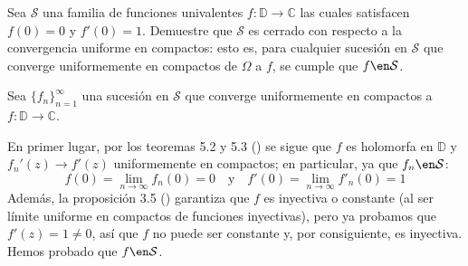 \setcounter{neje}{3}
\begin{nejer}
Sea $\mathcal{S}$ una familia de funciones univalentes $f\colon \mathbb{D} \to \mathbb{C}$ las cuales satisfacen $f(0) = 0$ y $f'(0) = 1$. Demuestre que $\mathcal{S}$ es cerrado con respecto a la convergencia uniforme en compactos: esto es, para cualquier sucesión en $\mathcal{S}$ que converge uniformemente en compactos de $\Omega$ a $f$, se cumple que $f \en \mathcal{S}$.
\end{nejer}
\begin{sol}
Sea $\{f_n\}^\infty_{n=1}$ una sucesión en $\mathcal{S}$ que converge uniformemente en compactos a $f\colon\mathbb{D} \to \mathbb{C}$.

En primer lugar, por los teoremas 5.2 y 5.3 (\cite[\S2.5]{stein}) se sigue que $f$ es holomorfa en $\mathbb{D}$ y $f_n'(z) \to f'(z)$ uniformemente en compactos; en particular, ya que $f_n\en\mathcal{S}$:
\[
f(0) = \lim_{n\to\infty}f_n(0) = 0
\quad\text{y}\quad
f'(0) = \lim_{n\to\infty}f'_n(0) = 1
\]
Además, la proposición 3.5 (\cite[\S8.3]{stein}) garantiza que $f$ es inyectiva o constante (al ser límite uniforme en compactos de funciones inyectivas), pero ya probamos que $f'(z)=1 \neq0$, así que $f$ no puede ser constante y, por consiguiente, es inyectiva. Hemos probado que $f\en\mathcal{S}$.
\end{sol}